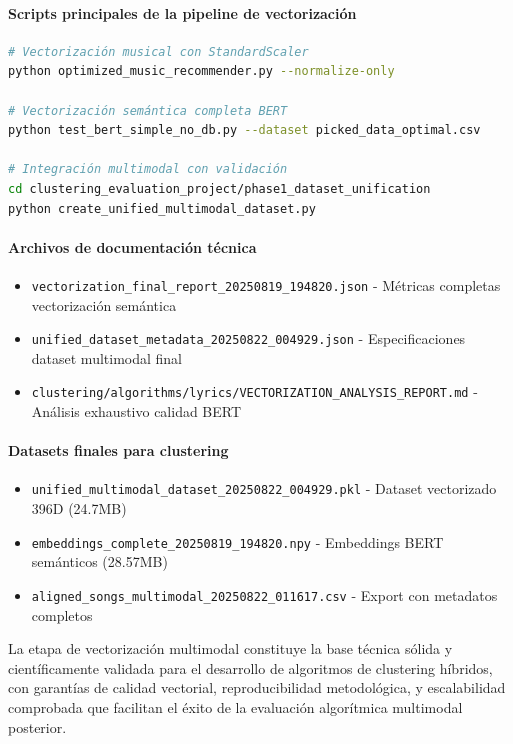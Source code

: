 \documentclass[12pt,a4paper]{article}
\begin{document}
\paragraph{Scripts principales de la pipeline de vectorización}

\begin{lstlisting}[language=bash, caption={Comandos principales para reproducibilidad}]
# Vectorización musical con StandardScaler
python optimized_music_recommender.py --normalize-only

# Vectorización semántica completa BERT
python test_bert_simple_no_db.py --dataset picked_data_optimal.csv

# Integración multimodal con validación
cd clustering_evaluation_project/phase1_dataset_unification
python create_unified_multimodal_dataset.py
\end{lstlisting}

\paragraph{Archivos de documentación técnica}
\begin{itemize}
    \item \texttt{vectorization\_final\_report\_20250819\_194820.json} - Métricas completas vectorización semántica
    \item \texttt{unified\_dataset\_metadata\_20250822\_004929.json} - Especificaciones dataset multimodal final
    \item \texttt{clustering/algorithms/lyrics/VECTORIZATION\_ANALYSIS\_REPORT.md} - Análisis exhaustivo calidad BERT
\end{itemize}

\paragraph{Datasets finales para clustering}
\begin{itemize}
    \item \texttt{unified\_multimodal\_dataset\_20250822\_004929.pkl} - Dataset vectorizado 396D (24.7MB)
    \item \texttt{embeddings\_complete\_20250819\_194820.npy} - Embeddings BERT semánticos (28.57MB)
    \item \texttt{aligned\_songs\_multimodal\_20250822\_011617.csv} - Export con metadatos completos
\end{itemize}

La etapa de vectorización multimodal constituye la base técnica sólida y científicamente validada para el desarrollo de algoritmos de clustering híbridos, con garantías de calidad vectorial, reproducibilidad metodológica, y escalabilidad comprobada que facilitan el éxito de la evaluación algorítmica multimodal posterior.
\end{document}

